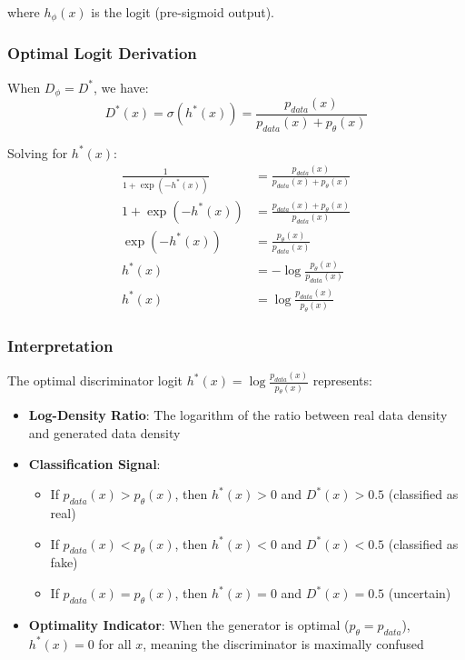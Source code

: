\documentclass[conference,12pt]{IEEEtran}
\begin{document}
where $h_\phi(x)$ is the logit (pre-sigmoid output).

\subsubsection{Optimal Logit Derivation}

When $D_\phi = D^*$, we have:
\begin{equation}
    D^*(x) = \sigma(h^*(x)) = \frac{p_{data}(x)}{p_{data}(x) + p_\theta(x)}
\end{equation}

Solving for $h^*(x)$:
\begin{align}
    \frac{1}{1 + \exp(-h^*(x))} &= \frac{p_{data}(x)}{p_{data}(x) + p_\theta(x)} \\
    1 + \exp(-h^*(x)) &= \frac{p_{data}(x) + p_\theta(x)}{p_{data}(x)} \\
    \exp(-h^*(x)) &= \frac{p_\theta(x)}{p_{data}(x)} \\
    h^*(x) &= -\log \frac{p_\theta(x)}{p_{data}(x)} \\
    h^*(x) &= \log \frac{p_{data}(x)}{p_\theta(x)}
\end{align}

\subsubsection{Interpretation}

The optimal discriminator logit $h^*(x) = \log \frac{p_{data}(x)}{p_\theta(x)}$ represents:

\begin{itemize}
    \item \textbf{Log-Density Ratio}: The logarithm of the ratio between real data density and generated data density
    
    \item \textbf{Classification Signal}: 
    \begin{itemize}
        \item If $p_{data}(x) > p_\theta(x)$, then $h^*(x) > 0$ and $D^*(x) > 0.5$ (classified as real)
        \item If $p_{data}(x) < p_\theta(x)$, then $h^*(x) < 0$ and $D^*(x) < 0.5$ (classified as fake)
        \item If $p_{data}(x) = p_\theta(x)$, then $h^*(x) = 0$ and $D^*(x) = 0.5$ (uncertain)
    \end{itemize}
    
    \item \textbf{Optimality Indicator}: When the generator is optimal ($p_\theta = p_{data}$), $h^*(x) = 0$ for all $x$, meaning the discriminator is maximally confused
\end{itemize}
\end{document}
